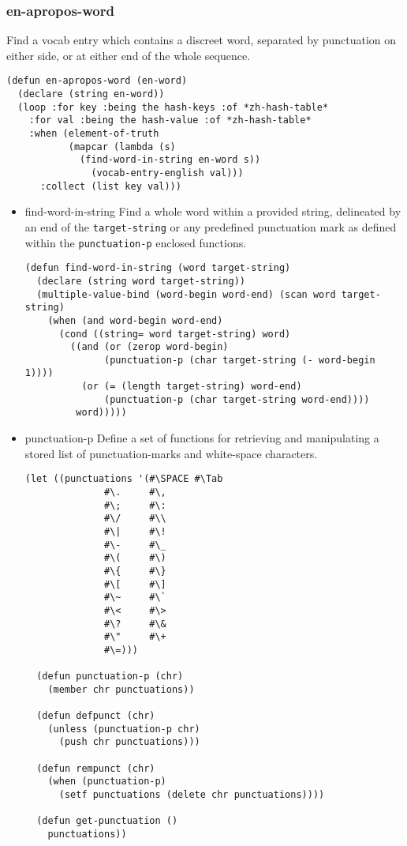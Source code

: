 \documentclass[11pt]{article}
\begin{document}
\subsubsection*{en-apropos-word}
\label{sec-4-5-5}
Find a vocab entry which contains a discreet word, separated by punctuation on
either side, or at either end of the whole sequence.
\begin{verbatim}
(defun en-apropos-word (en-word)
  (declare (string en-word))
  (loop :for key :being the hash-keys :of *zh-hash-table*
	:for val :being the hash-value :of *zh-hash-table*
	:when (element-of-truth
	       (mapcar (lambda (s)
			 (find-word-in-string en-word s))
		       (vocab-entry-english val)))
	  :collect (list key val)))
\end{verbatim}
\begin{itemize}
\item find-word-in-string
\label{sec-4-5-5-1}
Find a whole word within a provided string, delineated by an end of the
\texttt{target-string} or any predefined punctuation mark as defined within the
\texttt{punctuation-p} enclosed functions.
\begin{verbatim}
(defun find-word-in-string (word target-string)
  (declare (string word target-string))
  (multiple-value-bind (word-begin word-end) (scan word target-string)
    (when (and word-begin word-end)
      (cond ((string= word target-string) word)
	    ((and (or (zerop word-begin)
		      (punctuation-p (char target-string (- word-begin 1))))
		  (or (= (length target-string) word-end)
		      (punctuation-p (char target-string word-end))))
	     word)))))
\end{verbatim}
\item punctuation-p
\label{sec-4-5-5-2}
Define a set of functions for retrieving and manipulating a stored list of
punctuation-marks and white-space characters.
\begin{verbatim}
(let ((punctuations '(#\SPACE #\Tab
		      #\.     #\,
		      #\;     #\:
		      #\/     #\\
		      #\|     #\!
		      #\-     #\_
		      #\(     #\) 
		      #\{     #\}
		      #\[     #\]
		      #\~     #\`
		      #\<     #\>
		      #\?     #\&
		      #\"     #\+
		      #\=)))

  (defun punctuation-p (chr)
    (member chr punctuations))

  (defun defpunct (chr)
    (unless (punctuation-p chr)
      (push chr punctuations)))

  (defun rempunct (chr)
    (when (punctuation-p)
      (setf punctuations (delete chr punctuations))))

  (defun get-punctuation ()
    punctuations))
\end{verbatim}
\end{itemize}
\end{document}
